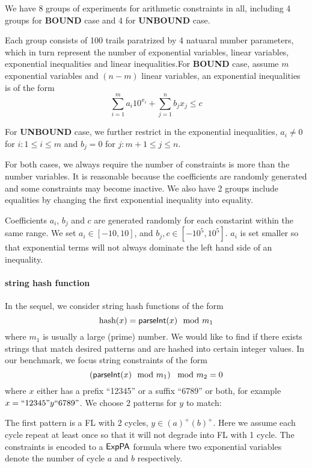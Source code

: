 We have 8 groups of experiments for arithmetic constraints in all, including 4 groups for \textbf{BOUND} case and 4 for \textbf{UNBOUND} case.

Each group consists of 100 trails paratrized by 4 natuaral number parameters, which in turn represent the number of exponential variables, linear variables, exponential inequalities and linear inequalities.For \textbf{BOUND} case, assume $m$ exponential variables and $(n-m)$ linear variables, an exponential inequalities is of the form
$$\sum_{i=1}^m a_i 10^{x_i} + \sum_{j=1}^n b_j x_j \le c$$

For \textbf{UNBOUND} case, we further restrict in the exponential inequalities, $a_i\neq 0$ for $i:1\le i\le m$ and $b_j=0$ for $j:m+1\le j \le n$.

For both cases, we always require the number of constraints is more than the number variables. It is reasonable because the coefficients are randomly generated and some constraints may become inactive. We also have 2 groups include equalities by changing the first exponential inequality into equality.  

Coefficients $a_i$, $b_j$ and $c$ are generated randomly for each constarint within the same range. We set $a_i\in [-10,10]$, and $b_j,c\in[-10^5,10^5]$. $a_i$ is set smaller so that exponential terms will not always dominate the left hand side of an inequality.

\paragraph{string hash function}

In the sequel, we consider string hash functions of the form  
\begin{equation}
    \text{hash}(x)= \textsf{parseInt}(x) \mod m_1  \notag
\end{equation}
where $m_1$ is usually a large (prime) number. We would like to find if there exists strings that match desired patterns and are hashed into certain integer values. In our benchmark, we focus string constraints of the form
\begin{equation}
    \left( \textsf{parseInt}(x) \mod m_1\right) \mod m_2 = 0   \notag
\end{equation}
where $x$ either has a prefix ``12345'' or a suffix ``6789'' or both, for example $x=``12345"y``6789"$. We choose 2 patterns for $y$ to match: 

The first pattern is a FL with 2 cycles, $y \in (a)^+(b)^+$. Here we assume each cycle repeat at least once so that it will not degrade into FL with 1 cycle. The constraints is encoded to a ${\sf ExpPA}$ formula where two exponential variables denote the number of cycle $a$ and $b$ respectively.

